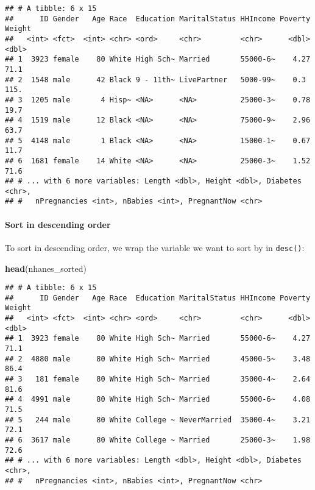 \documentclass[]{article}
\newenvironment{Shaded}{\begin{snugshade}}{\end{snugshade}}
\newcommand{\KeywordTok}[1]{\textcolor[rgb]{0.13,0.29,0.53}{\textbf{#1}}}
\newcommand{\StringTok}[1]{\textcolor[rgb]{0.31,0.60,0.02}{#1}}
\newcommand{\OperatorTok}[1]{\textcolor[rgb]{0.81,0.36,0.00}{\textbf{#1}}}
\newcommand{\NormalTok}[1]{#1}
\let\oldparagraph\paragraph
\renewcommand{\paragraph}[1]{\oldparagraph{#1}\mbox{}}
\begin{document}
\begin{verbatim}
## # A tibble: 6 x 15
##      ID Gender   Age Race  Education MaritalStatus HHIncome Poverty Weight
##   <int> <fct>  <int> <chr> <ord>     <chr>         <chr>      <dbl>  <dbl>
## 1  3923 female    80 White High Sch~ Married       55000-6~    4.27   71.1
## 2  1548 male      42 Black 9 - 11th~ LivePartner   5000-99~    0.3   115. 
## 3  1205 male       4 Hisp~ <NA>      <NA>          25000-3~    0.78   19.7
## 4  1519 male      12 Black <NA>      <NA>          75000-9~    2.96   63.7
## 5  4148 male       1 Black <NA>      <NA>          15000-1~    0.67   11.7
## 6  1681 female    14 White <NA>      <NA>          25000-3~    1.52   71.6
## # ... with 6 more variables: Length <dbl>, Height <dbl>, Diabetes <chr>,
## #   nPregnancies <int>, nBabies <int>, PregnantNow <chr>
\end{verbatim}

\paragraph{Sort in descending order}\label{sort-in-descending-order}

To sort in descending order, we wrap the variable we want to sort by in
\texttt{desc()}:

\begin{Shaded}
\end{Shaded}

\begin{Shaded}
\begin{Highlighting}[]
\KeywordTok{head}\NormalTok{(nhanes_sorted)}
\end{Highlighting}
\end{Shaded}

\begin{verbatim}
## # A tibble: 6 x 15
##      ID Gender   Age Race  Education MaritalStatus HHIncome Poverty Weight
##   <int> <fct>  <int> <chr> <ord>     <chr>         <chr>      <dbl>  <dbl>
## 1  3923 female    80 White High Sch~ Married       55000-6~    4.27   71.1
## 2  4880 male      80 White High Sch~ Married       45000-5~    3.48   86.4
## 3   181 female    80 White High Sch~ Married       35000-4~    2.64   81.6
## 4  4991 male      80 White High Sch~ Married       55000-6~    4.08   71.5
## 5   244 male      80 White College ~ NeverMarried  35000-4~    3.21   72.1
## 6  3617 male      80 White College ~ Married       25000-3~    1.98   72.6
## # ... with 6 more variables: Length <dbl>, Height <dbl>, Diabetes <chr>,
## #   nPregnancies <int>, nBabies <int>, PregnantNow <chr>
\end{verbatim}
\end{document}
